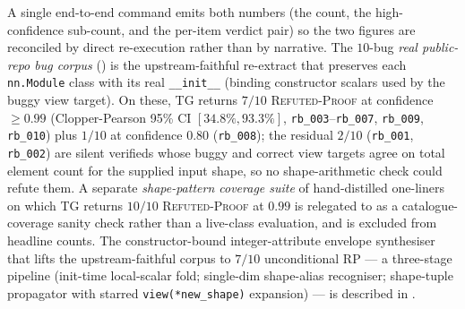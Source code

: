 A single end-to-end command emits both numbers (the count, the
high-confidence sub-count, and the per-item verdict pair) so the
two figures are reconciled by direct re-execution rather than by
narrative. The $10$-bug \emph{real public-repo bug
corpus} () is the upstream-faithful
re-extract that preserves each \texttt{nn.Module} class with
its real \texttt{\_\_init\_\_} (binding constructor scalars
used by the buggy view target). On these, \textsc{TG} returns
$7/10$ \textsc{Refuted-Proof} at confidence $\ge 0.99$
(Clopper-Pearson 95\% CI $[34.8\%, 93.3\%]$,
\texttt{rb\_003}--\texttt{rb\_007}, \texttt{rb\_009},
\texttt{rb\_010}) plus $1/10$ at confidence $0.80$
(\texttt{rb\_008}); the residual $2/10$
(\texttt{rb\_001}, \texttt{rb\_002}) are silent verifieds
whose buggy and correct view targets agree on total element
count for the supplied input shape, so no shape-arithmetic
check could refute them. A separate \emph{shape-pattern
coverage suite} of hand-distilled one-liners on which
\textsc{TG} returns $10/10$ \textsc{Refuted-Proof} at $0.99$
is relegated to  as a
catalogue-coverage sanity check rather than a live-class
evaluation, and is excluded from headline counts.
The constructor-bound integer-attribute envelope
synthesiser that lifts the upstream-faithful corpus to
$7/10$ unconditional RP --- a three-stage pipeline (init-time
local-scalar fold; single-dim shape-alias recogniser;
shape-tuple propagator with starred \texttt{view(*new\_shape)}
expansion) --- is described in .

